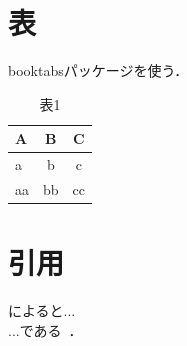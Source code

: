 \documentclass[11pt,a4paper, dvipdfmx]{article}
\begin{document}
\section{表}
booktabsパッケージを使う．
\begin{table}[h]
    \caption{表1}
    \label{table:table1}
    \centering
    \begin{tabular}{lcc}
        \toprule
        A  & B  & C  \\
        \midrule
        a  & b  & c  \\
        aa & bb & cc \\
        \bottomrule
    \end{tabular}
\end{table}

\section{引用}
\cite{jacot2018neural}によると...\\
...である~\cite{rafailov2023direct}．



\end{document}
